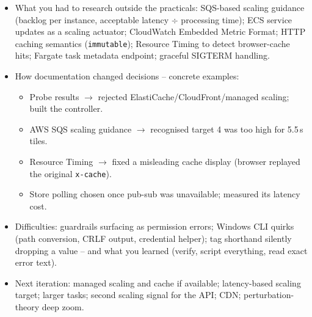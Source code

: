 \documentclass[a4paper,12pt]{article}
\begin{document}
\begin{yourwriting}
\begin{itemize}
    \item What you had to research outside the practicals: SQS-based scaling guidance (backlog per instance, acceptable latency $\div$ processing time); ECS service updates as a scaling actuator; CloudWatch Embedded Metric Format; HTTP caching semantics (\texttt{immutable}); Resource Timing to detect browser-cache hits; Fargate task metadata endpoint; graceful SIGTERM handling.
    \item How documentation changed decisions -- concrete examples:
    \begin{itemize}
        \item Probe results $\rightarrow$ rejected ElastiCache/CloudFront/managed scaling; built the controller.
        \item AWS SQS scaling guidance $\rightarrow$ recognised target 4 was too high for 5.5\,s tiles.
        \item Resource Timing $\rightarrow$ fixed a misleading cache display (browser replayed the original \texttt{x-cache}).
        \item Store polling chosen once pub-sub was unavailable; measured its latency cost.
    \end{itemize}
    \item Difficulties: guardrails surfacing as permission errors; Windows CLI quirks (path conversion, CRLF output, credential helper); tag shorthand silently dropping a value -- and what you learned (verify, script everything, read exact error text).
    \item Next iteration: managed scaling and cache if available; latency-based scaling target; larger tasks; second scaling signal for the API; CDN; perturbation-theory deep zoom.
\end{itemize}
\end{yourwriting}
\end{document}
